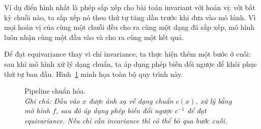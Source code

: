 Ví dụ điển hình nhất là phép sắp xếp cho bài toán invariant với hoán vị: với bất kỳ chuỗi nào, ta sắp xếp nó theo thứ tự tăng dần trước khi đưa vào mô hình. Vì mọi hoán vị của cùng một chuỗi đều cho ra cùng một dạng đã sắp xếp, mô hình luôn nhận cùng một đầu vào và cho ra cùng một kết quả. 

Để đạt equivariance thay vì chỉ invariance, ta thực hiện thêm một bước ở cuối: sau khi mô hình xử lý dạng chuẩn, ta áp dụng phép biến đổi ngược để khôi phục thứ tự ban đầu. Hình~\ref{fig:canon-pipeline} minh họa toàn bộ quy trình này.

\begin{figure}[H]
    \centering
    \caption[Pipeline chuẩn hóa]{%
      Pipeline chuẩn hóa.\\
      \textit{Ghi chú: Đầu vào $x$ được ánh xạ về dạng chuẩn $c(x)$, xử lý bằng mô hình $f$, sau đó áp dụng phép biến đổi ngược $c^{-1}$ để đạt equivariance. Nếu chỉ cần invariance thì có thể bỏ qua bước cuối.}%
    }
    \label{fig:canon-pipeline}
\end{figure}


